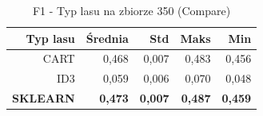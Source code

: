 \begin{table}[htbp]
\centering
\small
\setlength{\tabcolsep}{6pt}
\renewcommand{\arraystretch}{1.2}
\caption{F1 - Typ lasu na zbiorze 350 (Compare)}
\label{tab:Compare_on_350_f1}
\begin{tabular}{r|r|r|r|r}
\toprule
Typ lasu & Średnia & Std & Maks & Min \\
\hline
CART & 0,468 & 0,007 & 0,483 & 0,456 \\
ID3 & 0,059 & 0,006 & 0,070 & 0,048 \\
\textbf{SKLEARN} & \textbf{0,473} & \textbf{0,007} & \textbf{0,487} & \textbf{0,459} \\
\bottomrule
\end{tabular}
\end{table}